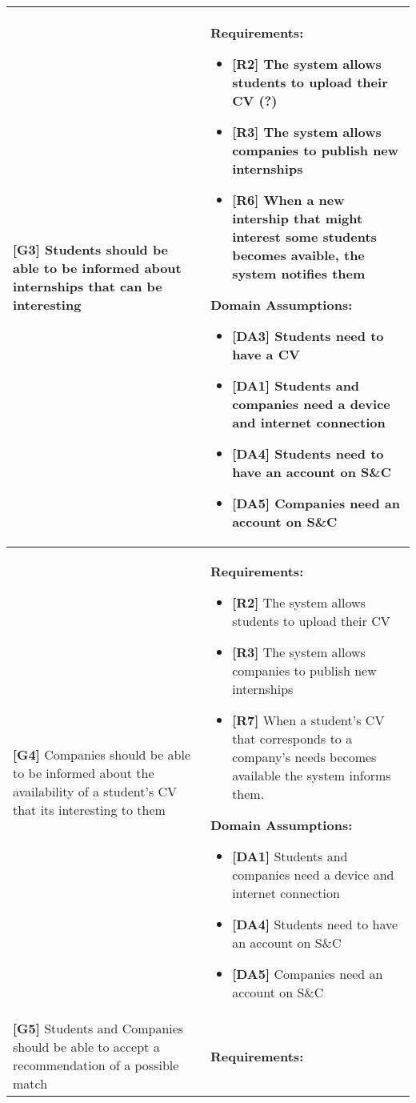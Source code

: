 \begin{longtable}{|p{}|p{}|}
\hline
\textbf{[G3]} Students should be able to be informed about internships that can be interesting 
& 
\textbf{Requirements:}
\begin{itemize}
    \item \textbf{[R2]} The system allows students to upload their CV (?)
    \item \textbf{[R3]} The system allows companies to publish new internships
    \item \textbf{[R6]} When a new intership that might interest some students becomes avaible, the system notifies them
\end{itemize}
\textbf{Domain Assumptions:}
\begin{itemize}
    \item \textbf{[DA3]} Students need to have a CV
    \item \textbf{[DA1]} Students and companies need a device and internet connection
    \item \textbf{[DA4]} Students need to have an account on S\&C
    \item \textbf{[DA5]} Companies need an account on S\&C
\end{itemize} \\
\hline
\textbf{[G4]} Companies should be able to be informed about the availability of a student's CV that its interesting to them
& 
\textbf{Requirements:}
\begin{itemize}
    \item \textbf{[R2]} The system allows students to upload their CV
    \item \textbf{[R3]} The system allows companies to publish new internships
    \item \textbf{[R7]} When a student’s CV that corresponds to a company’s needs becomes available the system informs them.
\end{itemize}
\textbf{Domain Assumptions:}
\begin{itemize}
    \item \textbf{[DA1]} Students and companies need a device and internet connection
    \item \textbf{[DA4]} Students need to have an account on S\&C
    \item \textbf{[DA5]} Companies need an account on S\&C
\end{itemize} \\
\hline
\textbf{[G5]} Students and Companies should be able to accept a recommendation of a possible match
& 
\textbf{Requirements:}
\begin{itemize}

\end{itemize}
\end{longtable}
